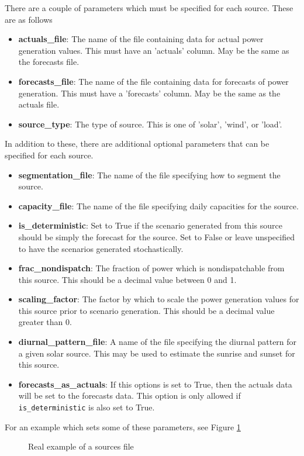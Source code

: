 \documentclass[11pt]{article}
\begin{document}
There are a couple of parameters which must be specified for each source. These are as follows
\begin{itemize}
	\item \textbf{actuals\_file}: The name of the file containing data for actual power generation values. This must have an 'actuals' column. May be the same as the forecasts file.
	\item \textbf{forecasts\_file}: The name of the file containing data for forecasts of power generation.
	This must have a 'forecasts' column. May be the same as the actuals file.
	\item \textbf{source\_type}: The type of source. This is one of 'solar', 'wind', or 'load'.
\end{itemize}

In addition to these, there are additional optional parameters that can be specified for each source.
\begin{itemize}
	\item \textbf{segmentation\_file}: The name of the file specifying how to segment the source.
	\item \textbf{capacity\_file}: The name of the file specifying daily capacities for the source.
	\item \textbf{is\_deterministic}: Set to True if the scenario generated from this source should be simply the forecast for the source. Set to False or leave unspecified to have the scenarios generated stochastically.
	\item \textbf{frac\_nondispatch}: The fraction of power which is nondispatchable from this source. This should be a decimal value between 0 and 1.
	\item \textbf{scaling\_factor}: The factor by which to scale the power generation values for this source prior to scenario generation. This should be a decimal value greater than 0.
	\item \textbf{diurnal\_pattern\_file}: A name of the file specifying the diurnal pattern for a given solar source. This may be used to estimate the sunrise and sunset for this source.
	\item \textbf{forecasts\_as\_actuals}: If this options is set to True, then the actuals data will be set to the forecasts data. This option is only allowed if \texttt{is\_deterministic} is also set to True.
\end{itemize}

For an example which sets some of these parameters, see Figure \ref{fig:sources2}
\begin{figure}[H]
	\begin{framed}
		
	\end{framed}
	\caption{Real example of a sources file}
	\label{fig:sources2}
\end{figure}
\end{document}
